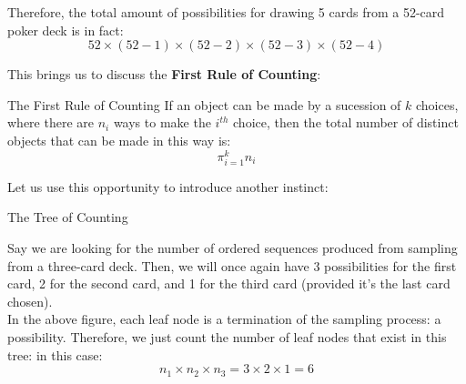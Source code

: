Therefore, the total amount of possibilities for drawing 5 cards from a 52-card poker deck is in fact:
\[52 \times (52 - 1) \times (52 - 2) \times (52 - 3) \times (52 - 4)\]

This brings us to discuss the \textbf{First Rule of Counting}:
\begin{ln-axiom}{The First Rule of Counting}{}
    If an object can be made by a sucession of $k$ choices, where there are $n_i$ ways to make the $i^{th}$ choice, then the total number of distinct objects that can be made in this way is:
    \[\pi_{i = 1}^k n_i\]
\end{ln-axiom}

Let us use this opportunity to introduce another instinct:
\begin{ln-fig}{The Tree of Counting}{}
    \begin{center}
    \end{center}
\end{ln-fig}
Say we are looking for the number of ordered sequences produced from sampling from a three-card deck. Then, we will once again have 3 possibilities for the first card, 2 for the second card, and 1 for the third card (provided it's the last card chosen). \\
In the above figure, each leaf node is a termination of the sampling process: a possibility. Therefore, we just count the number of leaf nodes that exist in this tree: in this case:
\[n_1 \times n_2 \times n_3 = 3 \times 2 \times 1 = 6\]

